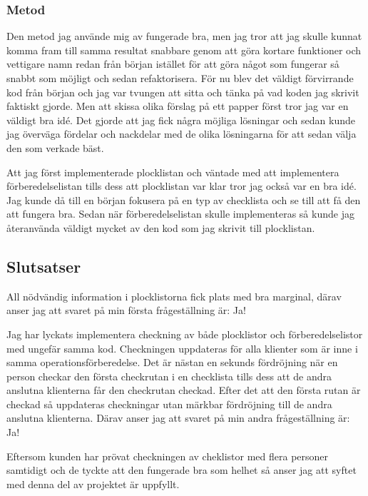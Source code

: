\subsubsection{Metod}
Den metod jag använde mig av fungerade bra, men jag tror att jag skulle kunnat komma fram till samma resultat snabbare genom att göra kortare funktioner och vettigare namn redan från början istället för att göra något som fungerar så snabbt som möjligt och sedan refaktorisera. För nu blev det väldigt förvirrande kod från början och jag var tvungen att sitta och tänka på vad koden jag skrivit faktiskt gjorde. Men att skissa olika förslag på ett papper först tror jag var en väldigt bra idé. Det gjorde att jag fick några möjliga lösningar och sedan kunde jag överväga fördelar och nackdelar med de olika lösningarna för att sedan välja den som verkade bäst.

\pagebreak
Att jag först implementerade plocklistan och väntade med att implementera förberedelselistan tills dess att plocklistan var klar tror jag också var en bra idé. Jag kunde då till en början fokusera på en typ av checklista och se till att få den att fungera bra. Sedan när förberedelselistan skulle implementeras så kunde jag återanvända väldigt mycket av den kod som jag skrivit till plocklistan.

\subsection{Slutsatser}
All nödvändig information i plocklistorna fick plats med bra marginal, därav anser jag att svaret på min första frågeställning är: Ja!

Jag har lyckats implementera checkning av både plocklistor och förberedelselistor med ungefär samma kod. Checkningen uppdateras för alla klienter som är inne i samma operationsförberedelse. Det är nästan en sekunds fördröjning när en person checkar den första checkrutan i en checklista tills dess att de andra anslutna klienterna får den checkrutan checkad. Efter det att den första rutan är checkad så uppdateras checkningar utan märkbar fördröjning till de andra anslutna klienterna. Därav anser jag att svaret på min andra frågeställning är: Ja!

Eftersom kunden har prövat checkningen av cheklistor med flera personer samtidigt och de tyckte att den fungerade bra som helhet så anser jag att syftet med denna del av projektet är uppfyllt.

